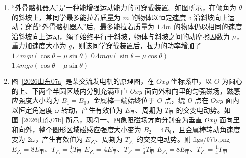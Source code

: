 \documentclass[\gkver]{gaokaozhenti}
\begin{document}
\begin{enumerate}
\item
“外骨骼机器人”是一种能增强运动能力的可穿戴装置。如图所示，在倾角为 $\theta$ 的斜坡上，某同学最多能拉着质量为 $m$ 的物体以恒定速度 $v$ 沿斜坡向上运动；穿戴“外骨骼机器人”后，最多能拉着质量为 $1.4m$ 的物体仍以相同的速度沿斜坡向上运动，绳子始终平行于斜坡，物体与斜坡之间的动摩擦因数为 $\mu$，重力加速度大小为 $g$，则该同学穿戴装置后，拉力的功率增加了 
\onepicture[w=3.85cm]{}
{$1.4mgv(\cos\theta + \mu\sin\theta)$}
{$0.4mgv(\sin\theta - \mu\cos\theta)$}
{$1.4mgv(\cos\theta - \mu\sin\theta)$}

\item
图~\ref{2026山东07a} 是某交流发电机的原理图，在 $Oxy$ 坐标系中，以 $O$ 为圆心的上、下两个半圆区域内分别充满垂直 $Oxy$ 面向外和向里的匀强磁场，磁感应强度大小均为 $B_{1} = B_{0}$，金属棒一端始终位于 $O$ 点，绕 $O$ 点在 $Oxy$ 面内以恒定角速度 $\omega$ 转动，产生有效值为 $E_{\text{甲}}$、周期为 $T_{\text{甲}}$ 的交变电动势。如图~\ref{2026山东07b} 所示，现将一、四象限磁场方向分别变为垂直 $Oxy$ 面向里和向外，整个圆形区域磁感应强度大小变为 $B_{2} = 4B_{0}$，且金属棒转动角速度变为 $2\omega$，产生有效值为 $E_{\text{乙}}$、周期为 $T_{\text{乙}}$ 的交变电动势。则 
{figs/07b.png}
{$E_{\text{乙}} = 8E_{\text{甲}}$、$T_{\text{乙}} = \frac{1}{2}T_{\text{甲}}$}
{$E_{\text{乙}} = 4E_{\text{甲}}$、$T_{\text{乙}} = \frac{1}{4}T_{\text{甲}}$}
{$E_{\text{乙}} = 8E_{\text{甲}}$、$T_{\text{乙}} = \frac{1}{4}T_{\text{甲}}$}
\end{enumerate}
\end{document}

